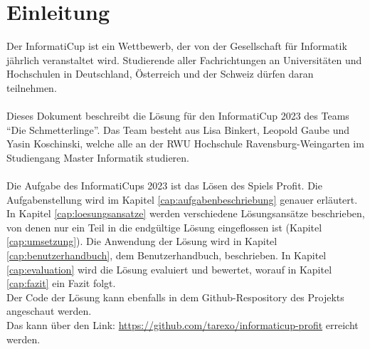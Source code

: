 \section{Einleitung}
Der InformatiCup ist ein Wettbewerb, der von der Gesellschaft für Informatik jährlich veranstaltet wird. Studierende aller Fachrichtungen an Universitäten und Hochschulen in Deutschland, Österreich und der Schweiz dürfen daran teilnehmen.
\\\\
Dieses Dokument beschreibt die Lösung für den InformatiCup 2023 des Teams “Die Schmetterlinge”. Das Team besteht aus Lisa Binkert, Leopold Gaube und Yasin Koschinski, welche alle an der RWU Hochschule Ravensburg-Weingarten im Studiengang Master Informatik studieren.
\\\\
Die Aufgabe des InformatiCups 2023 ist das Lösen des Spiels Profit. Die Aufgabenstellung wird im Kapitel \ref{cap:aufgabenbeschriebung}  genauer erläutert. In Kapitel \ref{cap:loesungsansatze} werden verschiedene Lösungsansätze beschrieben, von denen nur ein Teil in die endgültige Lösung eingeflossen ist (Kapitel \ref{cap:umsetzung}). Die Anwendung der Lösung wird in Kapitel \ref{cap:benutzerhandbuch}, dem Benutzerhandbuch, beschrieben. In Kapitel \ref{cap:evaluation} wird die Lösung evaluiert und bewertet, worauf in Kapitel \ref{cap:fazit} ein Fazit folgt.
\\
Der Code der Lösung kann ebenfalls in dem Github-Respository des Projekts angeschaut werden. \\
Das kann über den Link: \url{https://github.com/tarexo/informaticup-profit} erreicht werden.

